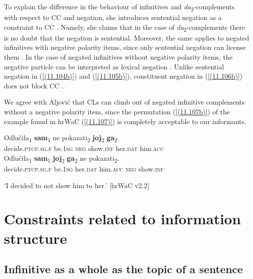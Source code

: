 \noindent To explain the difference in the behaviour of infinitives and \textit{da}\textsubscript{2}-complements with respect to CC and negation, she introduces sentential negation as a constraint to CC \citep[7]{Aljovic05}. Namely, she claims that in the case of \textit{da}\textsubscript{2}-com\-ple\-ments there is no doubt that the negation is sentential. Moreover, the same applies to negated infinitives with negative polarity items, since only sentential negation can license them \citep[cf.][7]{Aljovic05}. In the case of negated infinitives without negative polarity items, the negative particle can be interpreted as lexical negation \citep[cf.][7]{Aljovic05}. Unlike sentential negation in (\ref{(11.104b)}) and (\ref{(11.105b)}), constituent negation in (\ref{(11.106b)}) does not block CC \citep[cf.][7]{Aljovic05}. 

We agree with Aljović that CLs can climb out of negated infinitive complements without a negative polarity item, since the permutation (\ref{(11.107b)}) of the example found in hrWaC (\ref{(11.107)}) is completely acceptable to our informants. 

\begin{exe}\ex\begin{xlist}
\ex\label{(11.107)}
\gll Odlučila\textsubscript{1} \textbf{sam}\textsubscript{1} ne pokazati\textsubscript{2} \textbf{joj}\textsubscript{2} \textbf{ga}\textsubscript{2}. \\
decide.\textsc{ptcp}.\textsc{sg}.\textsc{f} be.1\textsc{sg} \textsc{neg} show.\textsc{inf} her.\textsc{dat} him.\textsc{acc} \\
\ex\label{(11.107b)}
\gll Odlučila\textsubscript{1} \textbf{sam}\textsubscript{1} \textbf{joj}\textsubscript{2} \textbf{ga}\textsubscript{2} ne pokazati\textsubscript{2}. \\
 decide.\textsc{ptcp}.\textsc{sg}.\textsc{f} be.1\textsc{sg} her.\textsc{dat} him.\textsc{acc} \textsc{neg} show.\textsc{inf}  \\
\end{xlist}
\glt ‘I decided to not show him to her.’
\hfill [hrWaC v2.2]
\end{exe}

\section{Constraints related to information structure}
\label{Infinitive as a whole as the topic of a sentence}

\subsection{Infinitive as a whole as the topic of a sentence}
\label{Infinitive as a whole as the topic of a sentence:real}

